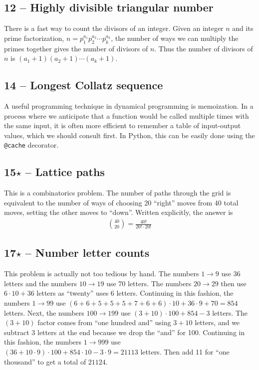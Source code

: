 \documentclass{article}
\begin{document}
\subsection*{12 -- Highly divisible triangular number} 
There is a fast way to count the divisors of an integer. 
Given an integer $n$ and its prime factorization, $n = p_1^{a_1} p_2^{a_2} \dotsb p_k^{a_k}$, the number of ways we can multiply the primes together gives the number of divisors of $n$. 
Thus the number of divisors of $n$ is $(a_1 + 1)(a_2 + 1)\dotsb(a_k+1)$. 

\subsection*{14 -- Longest Collatz sequence} 
A useful programming technique in dynamical programming is memoization. 
In a process where we anticipate that a function would be called multiple times with the same input, it is often more efficient to remember a table of input-output values, which we should consult first.
In Python, this can be easily done using the \texttt{@cache} decorator.

\subsection*{15$\star$ -- Lattice paths} 
This is a combinatorics problem. 
The number of paths through the grid is equivalent to the number of ways of choosing 20 ``right'' moves from 40 total moves, setting the other moves to ``down''. 
Written explicitly, the answer is 
\begin{align*}
	\boxed{ \binom{40}{20} = \frac{40!}{20! \cdot 20!} }
\end{align*}

\subsection*{17$\star$ -- Number letter counts} 
This problem is actually not too tedious by hand. 
The numbers $1 \to 9$ use 36 letters and the numbers $10 \to 19$ use 70 letters. 
The numbers $20 \to 29$ then use $6\cdot10 + 36$ letters as ``twenty'' uses 6 letters. 
Continuing in this fashion, the numbers $1 \to 99$ use $(6+6+5+5+5+7+6+6)\cdot10 + 36\cdot9 + 70 = 854$ letters. 
Next, the numbers $100 \to 199$ use $(3+10)\cdot100 + 854 - 3$ letters. 
The $(3+10)$ factor comes from ``one hundred and'' using $3 + 10$ letters, and we subtract 3 letters at the end because we drop the ``and'' for 100. Continuing in this fashion, the numbers $1 \to 999$ use $(36 + 10\cdot9)\cdot100 + 854\cdot10 - 3\cdot9 = 21113$ letters. Then add 11 for ``one thousand'' to get a total of $\boxed{ 21124 }$.
\end{document}
